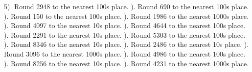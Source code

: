 \documentclass{article}%
\begin{document}
5). Round 2948 to the nearest 100s place.%
\newline%
\newline%
). Round 690 to the nearest 100s place.%
\newline%
\newline%
). Round 150 to the nearest 100s place.%
\newline%
\newline%
). Round 1986 to the nearest 1000s place.%
\newline%
\newline%
). Round 4097 to the nearest 10s place.%
\newline%
\newline%
). Round 4644 to the nearest 100s place.%
\newline%
\newline%
). Round 2291 to the nearest 10s place.%
\newline%
\newline%
). Round 5303 to the nearest 100s place.%
\newline%
\newline%
). Round 8346 to the nearest 10s place.%
\newline%
\newline%
). Round 2486 to the nearest 10s place.%
\newline%
\newline%
). Round 3096 to the nearest 1000s place.%
\newline%
\newline%
). Round 4986 to the nearest 100s place.%
\newline%
\newline%
). Round 8256 to the nearest 10s place.%
\newline%
\newline%
). Round 4231 to the nearest 1000s place.%
\newline%
\end{document}

